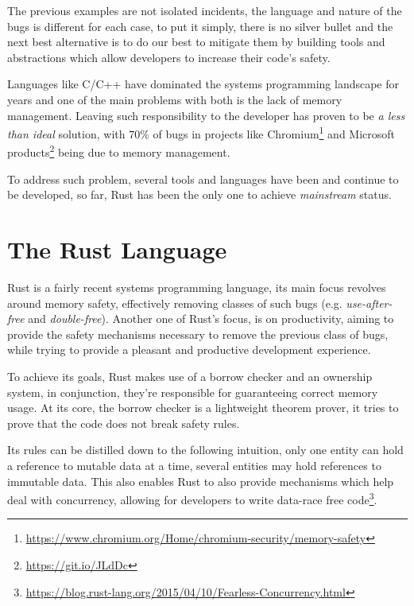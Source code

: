 The previous examples are not isolated incidents, the language and nature of the bugs is different for each case,
to put it simply, there is no silver bullet and the next best alternative is to do our best to mitigate them by
building tools and abstractions which allow developers to increase their code's safety.

Languages like C/C++ have dominated the systems programming landscape for years and
one of the main problems with both is the lack of memory management.
Leaving such responsibility to the developer has proven to be \emph{a less than ideal}
solution, with $70\%$ of bugs in projects like Chromium\footnote{\url{https://www.chromium.org/Home/chromium-security/memory-safety}}
and Microsoft products\footnote{\url{https://git.io/JLdDc}} being due to memory management.

To address such problem, several tools and languages have been and continue to be developed,
so far, Rust has been the only one to achieve \emph{mainstream} status.

\section{The Rust Language}\label{sec:rust-lang}

Rust is a fairly recent systems programming language,
its main focus revolves around memory safety,
effectively removing classes of such bugs (e.g. \emph{use-after-free} and \emph{double-free}).
Another one of Rust's focus, is on productivity,
aiming to provide the safety mechanisms necessary to remove the previous class of bugs,
while trying to provide a pleasant and productive development experience.

To achieve its goals, Rust makes use of a borrow checker and an ownership system,
in conjunction, they're responsible for guaranteeing correct memory usage.
At its core, the borrow checker is a lightweight theorem prover,
it tries to prove that the code does not break safety rules.

Its rules can be distilled down to the following intuition,
only one entity can hold a reference to mutable data at a time,
several entities may hold references to immutable data.
This also enables Rust to also provide mechanisms which help deal with concurrency,
allowing for developers to write data-race free
code\footnote{\url{https://blog.rust-lang.org/2015/04/10/Fearless-Concurrency.html}}.

